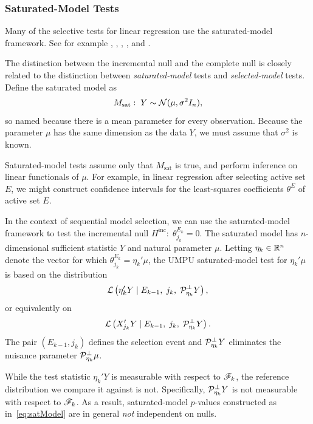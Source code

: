 \documentclass{article}
\begin{document}
\subsubsection{Saturated-Model Tests}

Many of the selective tests for linear regression use the saturated-model framework. See for example \citet{lockhart2014significance}, \citet{taylor2013tests}, \citet{taylor2014exact}, \citet{lee2013exact}, and \citet{loftus2014significance}.

The distinction between the incremental null and the complete null is closely related to the distinction between {\em saturated-model} tests and {\em selected-model} tests. Define the saturated model as
\[
M_{\text{sat}}:\; Y \sim \mathcal{N}(\mu, \sigma^2I_n),
\]
so named because there is a mean parameter for every observation. Because the parameter $\mu$ has the same dimension as the data $Y$, we must assume that $\sigma^2$ is known.

Saturated-model tests assume only that $M_{\text{sat}}$ is true, and perform inference on linear functionals of $\mu$. For example, in linear regression after selecting active set $E$, we might construct confidence intervals for the least-squares coefficients $\theta^E$ of active set $E$.

In the context of sequential model selection, we can use the saturated-model framework to test the incremental null $H^{\text{inc}}:\; \theta_{j_k}^{E_k} = 0$. The saturated model has $n$-dimensional sufficient statistic $Y$ and natural parameter $\mu$. Letting $\eta_k\in \mathbb{R}^n$ denote the vector for which $\theta_{j_k}^{E_k} = \eta_k'\mu$, the UMPU saturated-model test for $\eta_k'\mu$ is based on the distribution
\begin{equation}\label{eq:satModel}
\mathcal{L}\left( \eta_k'Y \mid E_{k-1}, \;j_k, \;\mathcal{P}_{\eta_k}^\perp Y \right),
\end{equation}
or equivalently on
\begin{equation}\label{eq:satModelEquiv}
\mathcal{L}\left( X_{j_k}'Y \mid E_{k-1}, \;j_k, \;\mathcal{P}_{\eta_k}^\perp Y \right).
\end{equation}
The pair $(E_{k-1}, j_k)$ defines the selection event and $\mathcal{P}_{\eta_k}^\perp Y$ eliminates the nuisance parameter $\mathcal{P}_{\eta_k}^\perp \mu$.

While the test statistic $\eta_k'Y$ is measurable with respect to $\mathscr{F}_k$, the reference distribution we compare it against is not. Specifically, $\mathcal{P}_{\eta_k}^\perp Y$ is not measurable with respect to $\mathscr{F}_k$. As a result, saturated-model $p$-values constructed as in~\eqref{eq:satModel} are in general {\em not} independent on nulls.
\end{document}

